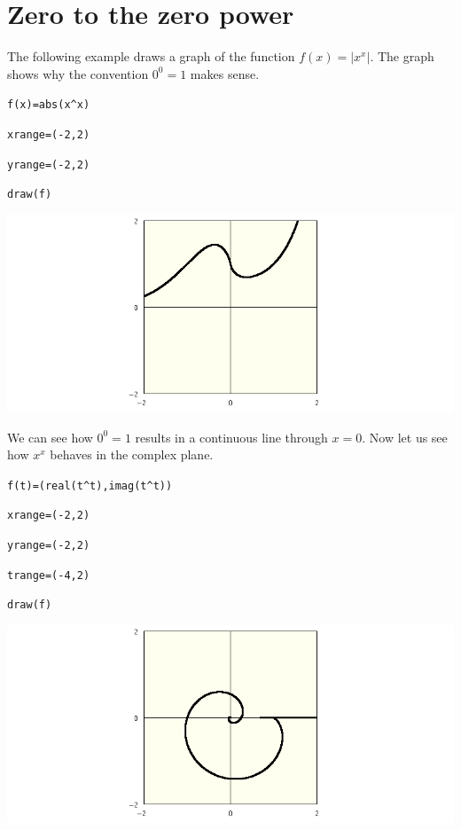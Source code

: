 \section*{Zero to the zero power}

The following example draws a graph of the function $f(x)=|x^x|$.
The graph shows why the convention $0^0=1$ makes sense.

\medskip
\verb$f(x)=abs(x^x)$

\verb$xrange=(-2,2)$

\verb$yrange=(-2,2)$

\verb$draw(f)$

\begin{center}
\includegraphics[scale=0.4]{zerozero.png}
\end{center}

\medskip
\noindent
We can see how $0^0=1$ results in a continuous line through $x=0$.
Now let us see how $x^x$ behaves in the complex plane.

\medskip
\verb$f(t)=(real(t^t),imag(t^t))$

\verb$xrange=(-2,2)$

\verb$yrange=(-2,2)$

\verb$trange=(-4,2)$

\verb$draw(f)$

\begin{center}
\includegraphics[scale=0.4]{zerozero2.png}
\end{center}
